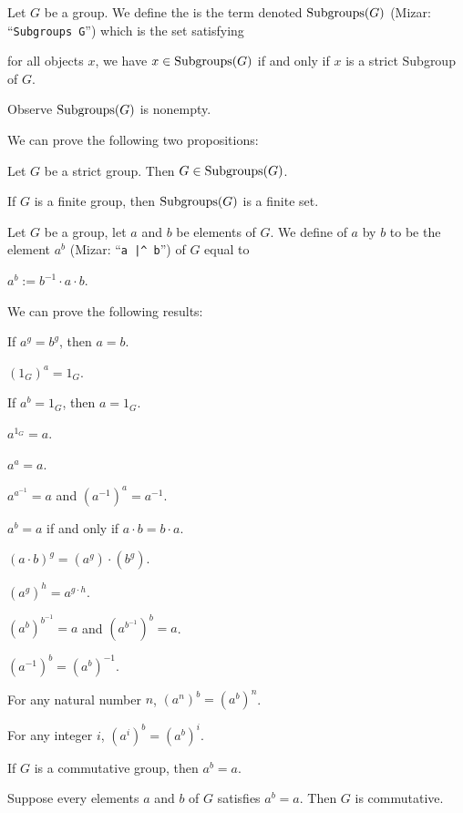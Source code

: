 \documentclass{article}
\begin{document}
\begin{definition}
Let $G$ be a group. We define the  is
the term denoted $\operatorname{Subgroups}(G)$ (Mizar: ``\verb#Subgroups G#'') which is the set satisfying
\begin{defn}
\item for all objects $x$, we have $x\in\operatorname{Subgroups}(G)$ if and only if
  $x$ is a strict Subgroup of $G$.
\end{defn}
\end{definition}

Observe $\operatorname{Subgroups}(G)$ is nonempty.

We can prove the following two propositions:
\begin{thm}
\item\label{group3:14} Let $G$ be a strict group. Then $G\in\operatorname{Subgroups}(G)$.
\item\label{group3:15} If $G$ is a finite group, then $\operatorname{Subgroups}(G)$ is
  a finite set.
\end{thm}

\begin{definition}
Let $G$ be a group, let $a$ and $b$ be elements of $G$.
We define  of $a$ by $b$ to be the element $a^{b}$
(Mizar: ``\verb#a |^ b#'') of $G$ equal to
\begin{defn}
\item $a^{b} := b^{-1}\cdot a\cdot b$.
\end{defn}
\end{definition}

We can prove the following results:
\begin{thm}
\item\label{group3:16} If $a^{g}=b^{g}$, then $a=b$.
\item\label{group3:17} $(1_{G})^{a}=1_{G}$.
\item\label{group3:18} If $a^{b}=1_{G}$, then $a=1_{G}$.
\item\label{group3:19} $a^{1_{G}}=a$.
\item\label{group3:20} $a^{a}=a$.
\item\label{group3:21} $a^{a^{-1}}=a$ and $(a^{-1})^{a}=a^{-1}$.
\item\label{group3:22} $a^{b}=a$ if and only if $a\cdot b=b\cdot a$.
\item\label{group3:23} $(a\cdot b)^{g}=(a^{g})\cdot(b^{g})$.
\item\label{group3:24} $(a^{g})^{h}=a^{g\cdot h}$.
\item\label{group3:25} $(a^{b})^{b^{-1}}=a$ and $(a^{b^{-1}})^{b}=a$.
\item\label{group3:26} $(a^{-1})^{b}=(a^{b})^{-1}$.
\item\label{group3:27} For any natural number $n$, $(a^{n})^{b}=(a^{b})^{n}$.
\item\label{group3:28} For any integer $i$, $(a^{i})^{b}=(a^{b})^{i}$.
\item\label{group3:29} If $G$ is a commutative group, then $a^{b}=a$.
\item\label{group3:30} Suppose every elements $a$ and $b$ of $G$
  satisfies $a^{b}=a$. Then $G$ is commutative.
\end{thm}
\end{document}
